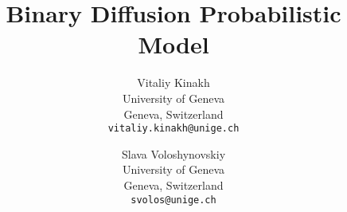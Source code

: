\documentclass[10pt,twocolumn,letterpaper]{article}
\title{Binary Diffusion Probabilistic Model}
\author{Vitaliy Kinakh\\
University of Geneva\\
Geneva, Switzerland\\
{\tt\small vitaliy.kinakh@unige.ch}
\and
Slava Voloshynovskiy\\
University of Geneva\\
Geneva, Switzerland\\
{\tt\small svolos@unige.ch}
}
\begin{document}
\maketitle



    






{
    \small
    
    
}

% 

\newpage

\end{document}
